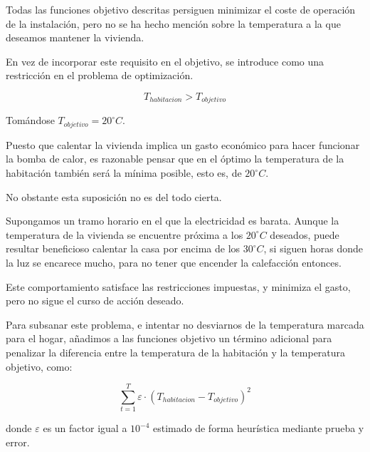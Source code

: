 Todas las funciones objetivo descritas persiguen minimizar el coste de
operación de la instalación, pero no se ha hecho mención sobre la temperatura a
la que deseamos mantener la vivienda.

En vez de incorporar este requisito en el objetivo, se introduce como una
restricción en el problema de optimización.

\begin{equation}
	T_{habitacion} > T_{objetivo}
\end{equation}

Tomándose $T_{objetivo} = 20 ^\circ C$.

Puesto que calentar la vivienda implica un gasto económico para hacer funcionar la bomba de calor,
es razonable pensar que en el óptimo la temperatura de la habitación también será la mínima posible,
esto es, de $20 ^\circ C$.

No obstante esta suposición no es del todo cierta.

Supongamos un tramo horario en el que la electricidad es barata. Aunque la
temperatura de la vivienda se encuentre próxima a los $20 ^\circ C$ deseados,
puede resultar beneficioso calentar la casa por encima de los $30 ^\circ C$, si
siguen horas donde la luz se encarece mucho, para no tener que encender la
calefacción entonces.

Este comportamiento satisface las restricciones impuestas, y minimiza el gasto, pero
no sigue el curso de acción deseado.

Para subsanar este problema, e intentar no desviarnos de la temperatura marcada para
el hogar, añadimos a las funciones objetivo un término adicional para penalizar
la diferencia entre la temperatura de la habitación y la temperatura objetivo, como:

\begin{equation} \label{eq:temperature_penalization}
	\sum_{t=1}^{T} \varepsilon \cdot (T_{habitacion} - T_{objetivo})^2
\end{equation}

donde $\varepsilon$ es un factor igual a $10^{-4}$ estimado de forma heurística
mediante prueba y error.
